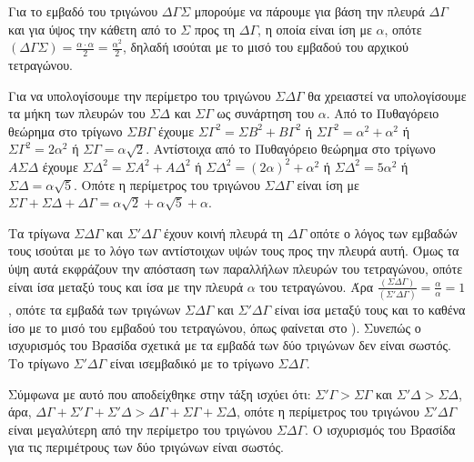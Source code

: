 \begin{alist}
\item [\textalpha)]
  Για το εμβαδό του τριγώνου $\Delta\Gamma\Sigma$ μπορούμε να πάρουμε για βάση την πλευρά $\Delta\Gamma$ και για ύψος την κάθετη από το $\Sigma$ προς τη $\Delta\Gamma$, η οποία είναι ίση με $\alpha$, οπότε $\left(\Delta\Gamma\Sigma\right) = \frac{\alpha \cdot \alpha}{2} = \frac{\alpha^2}{2}$, δηλαδή ισούται με το μισό του εμβαδού του αρχικού τετραγώνου. 
\begin{rlist}
\item [i.]
  Για να υπολογίσουμε την περίμετρο του τριγώνου $\Sigma\Delta\Gamma$ θα χρειαστεί να υπολογίσουμε τα μήκη των πλευρών του $\Sigma\Delta$ και $\Sigma\Gamma$ ως συνάρτηση του $\alpha$.
  Από το Πυθαγόρειο θεώρημα στο τρίγωνο $\Sigma B\Gamma$ έχουμε $\Sigma\Gamma^2 = \Sigma B^2 + B\Gamma^2$ ή $\Sigma\Gamma^2 = \alpha^2 + \alpha^2$ ή $\Sigma\Gamma^2 = 2\alpha^2$ ή $\Sigma\Gamma = \alpha\sqrt{2}$.
  Αντίστοιχα από το Πυθαγόρειο θεώρημα στο τρίγωνο $A\Sigma\Delta$ έχουμε $\Sigma\Delta^2 = \Sigma A^2 + A\Delta^2$ ή $\Sigma\Delta^2 = \left(2\alpha\right)^2 + \alpha^2$ ή $\Sigma\Delta^2 = 5\alpha^2$ ή $\Sigma\Delta = \alpha\sqrt{5}$.
  Οπότε η περίμετρος του τριγώνου $\Sigma\Delta\Gamma$ είναι ίση με $\Sigma\Gamma + \Sigma\Delta + \Delta\Gamma = \alpha\sqrt{2} + \alpha\sqrt{5} + \alpha$. 
\end{rlist}
\item [\textbeta)]
  Τα τρίγωνα $\Sigma\Delta\Gamma$ και $\Sigma'\Delta\Gamma$ έχουν κοινή πλευρά τη $\Delta\Gamma$ οπότε ο λόγος των εμβαδών τους ισούται με το λόγο των αντίστοιχων υψών τους προς την πλευρά αυτή.
  Όμως τα ύψη αυτά εκφράζουν την απόσταση των παραλλήλων πλευρών του τετραγώνου, οπότε είναι ίσα μεταξύ τους και ίσα με την πλευρά $\alpha$ του τετραγώνου.
  Άρα $\frac{\left(\Sigma\Delta\Gamma\right)}{\left(\Sigma'\Delta\Gamma\right)} = \frac{\alpha}{\alpha} = 1$, οπότε τα εμβαδά των τριγώνων $\Sigma\Delta\Gamma$ και $\Sigma'\Delta\Gamma$ είναι ίσα μεταξύ τους και το καθένα ίσο με το μισό του εμβαδού του τετραγώνου, όπως φαίνεται στο \textalpha).
  Συνεπώς ο ισχυρισμός του Βρασίδα σχετικά με τα εμβαδά των δύο τριγώνων δεν είναι σωστός.
  Το τρίγωνο $\Sigma'\Delta\Gamma$ είναι ισεμβαδικό με το τρίγωνο $\Sigma\Delta\Gamma$. 
\begin{rlist}
\item [ii.]
  Σύμφωνα με αυτό που αποδείχθηκε στην τάξη ισχύει ότι: $\Sigma'\Gamma > \Sigma\Gamma$ και $\Sigma'\Delta > \Sigma\Delta$, άρα, $\Delta\Gamma + \Sigma'\Gamma + \Sigma'\Delta > \Delta\Gamma + \Sigma\Gamma + \Sigma\Delta$, οπότε η περίμετρος του τριγώνου $\Sigma'\Delta\Gamma$ είναι μεγαλύτερη από την περίμετρο του τριγώνου $\Sigma\Delta\Gamma$.
  Ο ισχυρισμός του Βρασίδα για τις περιμέτρους των δύο τριγώνων είναι σωστός. 
\end{rlist}
\end{alist}
